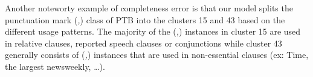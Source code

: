 Another noteworty example of completeness error is that our model splits the
punctuation mark ({\em ,}) class of PTB into the clusters 15 and 43 based on
the different usage patterns.  The majority of the ({\em ,}) instances in
cluster 15 are used in relative clauses, reported speech clauses or
conjunctions while cluster 43 generally consists of ({\em ,}) instances that
are used in non-essential clauses (ex: Time, the largest newsweekly, \ldots). 




